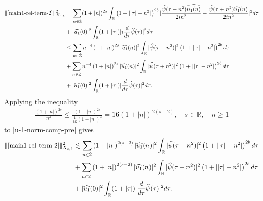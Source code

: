 \documentclass[12pt,reqno]{amsart}
\numberwithin{equation}{section}  %
\newcommand{\rr}{\mathbb{R}}
\newcommand{\zz}{\mathbb{Z}}
\newcommand{\zzdot}{\dot{\zz}}
\newcommand{\wh}{\widehat}
\begin{document}
\begin{equation}
  \begin{split}
    \| \eqref{main1-rel-term-2} \|_{X_{s,b}}^{2} 
    & = \sum_{n \in \zzdot}(1 + |n|)^{2s} \int_{\rr}\left( 1 + | | \tau
    |-n^{2} | \right)^{2b} | \frac{\wh{\psi}(\tau - n^{2})\wh{u_{1}(n)}}{2i
    n^{2}} -
    \frac{\wh{\psi}(\tau + n^{2})\wh{u_{1}}(n)}{2i n^{2}} |^{2} d \tau
    \\
    & + |\wh{u_{1}}(0)|^{2} \int_{\rr} (1 + | \tau |) | i \frac{d }{d \tau}
    \wh{\psi}(\tau)|^{2} d \tau
    \\
    & \le \sum_{n \in \dot{\zz}} n^{-4} \left( 1 + |n| \right)^{2s} | \wh{u_{1}}(n)
    |^{2} \int_{\rr} | \wh{\psi}(\tau - n^{2}) |^{2}\left( 1 + | | \tau | -
    n^{2} | \right)^{2b} d \tau
    \\
    & + \sum_{n \in \dot{\zz}} n^{-4} \left( 1 + |n| \right)^{2s} | \wh{u_{1}}(n)
    |^{2} \int_{\rr} | \wh{\psi}(\tau + n^{2}) |^{2}\left( 1 + | | \tau | -
    n^{2} | \right)^{2b} d \tau
    \\
    & + |\wh{u_{1}}(0)|^{2} \int_{\rr} (1 + | \tau |) |\frac{d }{d \tau}
    \wh{\psi}(\tau)|^2 d \tau.
\end{split}
\label{u-1-norm-comp-pre}
\end{equation}
%
%
Applying the inequality
%
%
\begin{equation*}
\begin{split}
  \frac{(1 + |n|)^{2s}}{ n^{4}} \le \frac{(1 + |n|)^{2s}}{\frac{1}{16}(1 +
  |n|)^{4}} = 16 (1 + | n |)^{2(s-2)},  \quad s \in \rr, \quad n \ge 1
\end{split}
\end{equation*}
%
to \eqref{u-1-norm-comp-pre} gives
%
\begin{equation}
  \begin{split}
    \|  \eqref{main1-rel-term-2}\|_{X_{s,b}}^{2} 
    & \lesssim \sum_{n \in \dot{\zz}} \left( 1 + |n| \right)^{2(s-2)} | \wh{u_{1}}(n)
    |^{2} \int_{\rr} | \wh{\psi}(\tau - n^{2}) |^{2}\left( 1 + | | \tau | -
    n^{2} | \right)^{2b} d \tau
    \\
    & + \sum_{n \in \dot{\zz}} \left( 1 + |n| \right)^{2(s-2)} | \wh{u_{1}}(n)
    |^{2} \int_{\rr} | \wh{\psi}(\tau + n^{2}) |^{2}\left( 1 + | | \tau | -
    n^{2} | \right)^{2b} d \tau
    \\
    & + |\wh{u_{1}}(0)|^{2} \int_{\rr} (1 + | \tau |) |\frac{d }{d \tau}
    \wh{\psi}(\tau)|^2 d \tau.
\end{split}
\label{u-1-norm-comp}
\end{equation}
\end{document}
